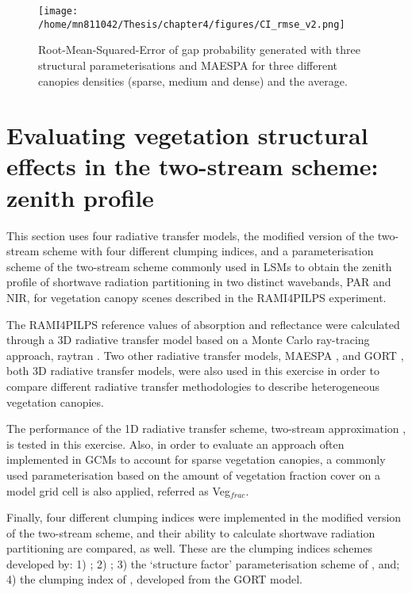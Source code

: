 \documentclass[a4paper,11pt]{report}
\begin{document}

\begin{figure}
\centering
\texttt{[image: /home/mn811042/Thesis/chapter4/figures/CI\_rmse\_v2.png]}
\caption{Root-Mean-Squared-Error of gap probability generated with three structural parameterisations and MAESPA for three different canopies densities (sparse, medium and dense) and the average.} 
\label{fig:ci_rmse}
\end{figure}

\section{Evaluating vegetation structural effects in the two-stream scheme: zenith profile}

This section uses four radiative transfer models, the modified version of the two-stream scheme with four different clumping indices, and a parameterisation scheme of the two-stream scheme commonly used in LSMs to obtain the zenith profile of shortwave radiation partitioning in two distinct wavebands, PAR and NIR, for vegetation canopy scenes described in the RAMI4PILPS experiment.

The RAMI4PILPS reference values of absorption and reflectance were calculated through a 3D radiative transfer model based on a Monte Carlo ray-tracing approach, raytran \citep{Govaerts1995}. Two other radiative transfer models, MAESPA \citep{Wang1990,Medlyn2004,Medlyn2007}, and GORT \citep{Li1995,Ni1997}, both 3D radiative transfer models, were also used in this exercise in order to compare different radiative transfer methodologies to describe heterogeneous vegetation canopies.

The performance of the 1D radiative transfer scheme, two-stream approximation \citep{Sellers1985}, is tested in this exercise. Also, in order to evaluate an approach often implemented in GCMs to account for sparse vegetation canopies, a commonly used parameterisation based on the amount of vegetation fraction cover on a model grid cell is also applied, referred as Veg$_{frac}$.

Finally, four different clumping indices were implemented in the modified version of the two-stream scheme, and their ability to calculate shortwave radiation partitioning are compared, as well. These are the clumping indices schemes developed by: 1) \citet{Nilson1971}; 2) \citet{Kucharik1999}; 3) the `structure factor' parameterisation scheme of \citet{pinty2006}, and; 4) the clumping index of \citet{Ni-Meister2010}, developed from the GORT model.
\end{document}

